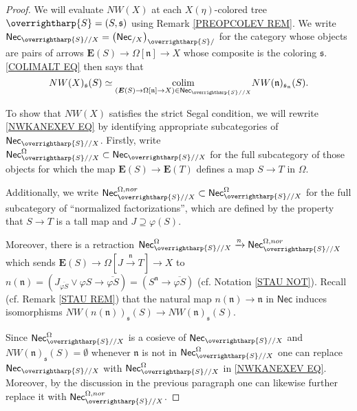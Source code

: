 \documentclass[a4paper,10pt
,draft
]{article}%
\numberwithin{equation}{section}
\numberwithin{figure}{section}
\theoremstyle{definition} %
\newcommand{\vect}[1]{\text{\overrightharp{\ensuremath{#1}}}}
\DeclareMathOperator{\colim}{colim}%
\newcommand{\1}{\ensuremath{\mathbbm 1}}%
\begin{document}
\begin{proof}
	We will evaluate 
	$NW(X)$ at each $X(\eta)$-colored tree
	$\vect{S}=(S,\mathfrak{s})$
	using Remark \ref{PREOPCOLEV REM}.
%	
	We write
	$\mathsf{Nec}_{\vect{S}//X}
	=
	\left(\mathsf{Nec}_{/X}\right)_{\vect{S}/}$
	for the category
	whose objects are pairs of arrows
	$\boldsymbol{E}(S) \to \Omega[\mathfrak{n}] \to X$
	whose composite is the coloring $\mathfrak{s}$.
	\eqref{COLIMALT EQ}
	then says that
\begin{equation}\label{NWKANEXEV EQ}
	NW(X)_{\mathfrak{s}}(S) 
	\simeq
	\underset{(\boldsymbol{E}(S) \to \Omega[\mathfrak{n}] \to X)
		\in \mathsf{Nec}_{\vect{S}//X}}{\colim}
	NW(\mathfrak{n})_{\mathfrak{s}_{\mathfrak{n}}}(S).
\end{equation}

	To show that $NW(X)$ satisfies the strict Segal condition, 
	we will rewrite \eqref{NWKANEXEV EQ} 
	by identifying appropriate subcategories of
	$\mathsf{Nec}_{\vect{S}//X}$.
	Firstly, write
	$\mathsf{Nec}_{\vect{S}//X}^{\Omega}
	\subset
	\mathsf{Nec}_{\vect{S}//X}$
	for the full subcategory of those objects for which the map
	$\boldsymbol{E}(S) \to \boldsymbol{E}(T)$
	defines a map $S \to T$ in $\Omega$.
		
	Additionally, we write 
	$
	\mathsf{Nec}_{\vect{S}//X}^{\Omega,nor}
	\subset
	\mathsf{Nec}_{\vect{S}//X}^{\Omega}
	$
	for the full subcategory of ``normalized factorizations'',
	which are defined by the property that
	$S \to T$ is a tall map and
	$J \supseteq \varphi(S)$.
	
	Moreover, there is a retraction
	$
	\mathsf{Nec}_{\vect{S}//X}^{\Omega}
	\xrightarrow{n}
	\mathsf{Nec}_{\vect{S}//X}^{\Omega,nor}
	$
	which sends
	$\boldsymbol{E}(S) \to \Omega[J \xrightarrow{\mathfrak{n}} T] \to X$
	to
	$n (\mathfrak{n}) = 
	(J_{\overline{\varphi S}} \vee \varphi S \to
	\overline{\varphi S})
	=
	(S^{\mathfrak{n}} \to \overline{\varphi S})
	$
	(cf. Notation \ref{STAU NOT}).
	Recall (cf. Remark \ref{STAU REM}) 
	that the natural map
	$n( \mathfrak{n}) \to \mathfrak{n}$ in $\mathsf{Nec}$
	induces isomorphisms
	$NW(n(\mathfrak{n}))_{\mathfrak{s}}(S) 
	\to
	NW(\mathfrak{n})_{\mathfrak{s}}(S)$.

	
	Since 
	$\mathsf{Nec}_{\vect{S}//X}^{\Omega}$
	is a cosieve of 
	$\mathsf{Nec}_{\vect{S}//X}$
	and 
	$NW(\mathfrak{n})_{\mathfrak{s}}(S) = \emptyset$
	whenever $\mathfrak{n}$ is not in 
	$\mathsf{Nec}_{\vect{S}//X}^{\Omega}$
	one can replace 
	$\mathsf{Nec}_{\vect{S}//X}$
	with 
	$\mathsf{Nec}_{\vect{S}//X}^{\Omega}$
	in
	\eqref{NWKANEXEV EQ}.
	Moreover, by the discussion in the previous paragraph one can
	likewise further replace it with
	$\mathsf{Nec}_{\vect{S}//X}^{\Omega,nor}$.
	

\end{proof}
\end{document}
